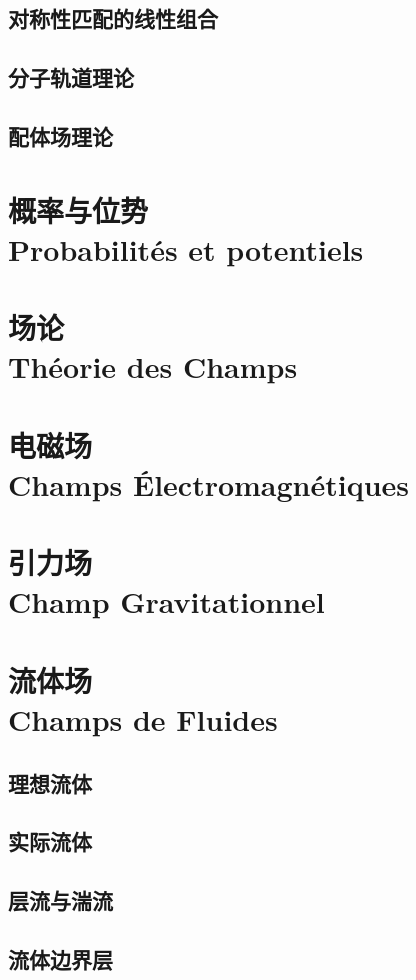 \documentclass[12pt, a4paper, oneside]{ctexbook}
\begin{document}
  \section{对称性匹配的线性组合}
  \section{分子轨道理论}
  \section{配体场理论}
  \chapter{概率与位势\\ Probabilités et potentiels}  
  \chapter{场论\\ Théorie des Champs} 
  \chapter{电磁场\\Champs Électromagnétiques}
  \chapter{引力场\\ Champ Gravitationnel}
  \chapter{流体场\\Champs de Fluides}
    \section{理想流体}
    \section{实际流体}
    \section{层流与湍流}
    \section{流体边界层}
\end{document}
